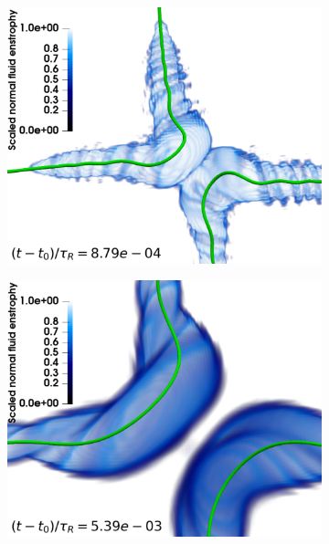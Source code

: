 \documentclass[%
 reprint,
 amsmath,amssymb,
 aps,
 prl,
]{revtex4-2}
\begin{document}
\begin{figure}
\begin{subfigure}[b]{0.24\textwidth}
		\includegraphics*[width=\textwidth]{snap-3.pdf}
	\end{subfigure}
    \begin{subfigure}[b]{0.24\textwidth}
		\centering
		\includegraphics*[width=\textwidth]{snap-4.pdf}


\end{subfigure}
\end{figure}
\end{document}
